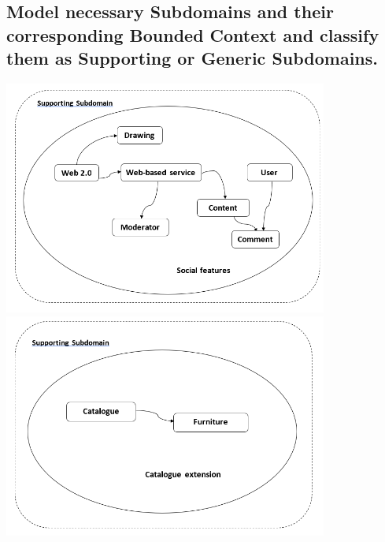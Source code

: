 		\subsection{Model necessary Subdomains and their corresponding Bounded Context and
			classify them as Supporting or Generic Subdomains.}
			\includegraphics[keepaspectratio,width=0.8\textwidth,angle=0]{images/ddd2.PNG}
			\newline
		\includegraphics[keepaspectratio,width=0.8\textwidth,angle=0]{images/ddd3.PNG}
		
